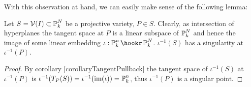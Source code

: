 With this observation at hand, we can easily make sense of the following lemma:

\begin{lemma} \label{lemmaIntersectionWithTangent}
Let $S = \operatorname{\mathcal V}(I) \subset \operatorname{\mathbb P}^N_k$ be a projective variety, $P\in S$.
Clearly, as intersection of hyperplanes the tangent space at $P$ is a linear subspace of $\operatorname{\mathbb P}^N_k$ and hence the image of some linear embedding $\iota : \proj^n_k \hookr \proj^N_k$.
$\iota^{-1}(S)$ has a singularity at $\iota^{-1}(P)$.
\end{lemma}
\begin{proof}
By corollary \ref{corollaryTangentPullback} the tangent space of $\iota^{-1}(S)$ at $\iota^{-1}(P)$ is $\iota^{-1}(T_P(S)) = \iota^{-1}({\operatorname{im}}(\iota)) = \operatorname{\mathbb P}^n_k$, thus $\iota^{-1}(P)$ is a singular point.
\end{proof}
